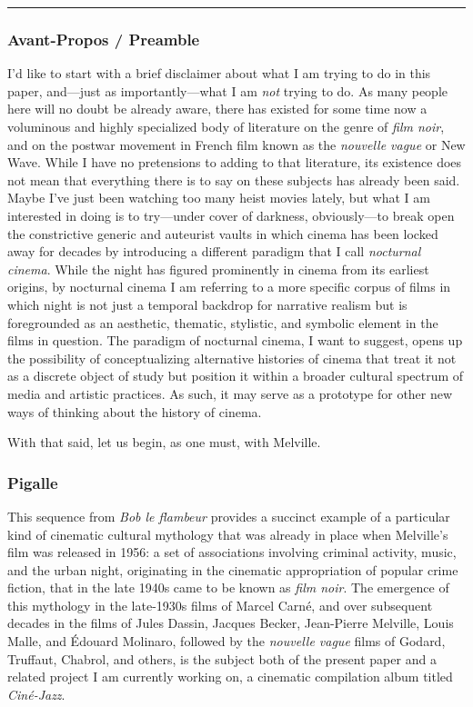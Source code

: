 \documentclass[
  letterpaper,
  DIV=11,
  numbers=noendperiod,
  oneside]{scrartcl}
\begin{document}
\begin{center}\rule{0.5\linewidth}{0.5pt}\end{center}

\subsubsection{Avant-Propos / Preamble}\label{avant-propos-preamble}

I'd like to start with a brief disclaimer about what I am trying to do
in this paper, and---just as importantly---what I am \emph{not} trying
to do. As many people here will no doubt be already aware, there has
existed for some time now a voluminous and highly specialized body of
literature on the genre of \emph{film noir}, and on the postwar movement
in French film known as the \emph{nouvelle vague} or New Wave. While I
have no pretensions to adding to that literature, its existence does not
mean that everything there is to say on these subjects has already been
said. Maybe I've just been watching too many heist movies lately, but
what I am interested in doing is to try---under cover of darkness,
obviously---to break open the constrictive generic and auteurist vaults
in which cinema has been locked away for decades by introducing a
different paradigm that I call \emph{nocturnal cinema}. While the night
has figured prominently in cinema from its earliest origins, by
nocturnal cinema I am referring to a more specific corpus of films in
which night is not just a temporal backdrop for narrative realism but is
foregrounded as an aesthetic, thematic, stylistic, and symbolic element
in the films in question. The paradigm of nocturnal cinema, I want to
suggest, opens up the possibility of conceptualizing alternative
histories of cinema that treat it not as a discrete object of study but
position it within a broader cultural spectrum of media and artistic
practices. As such, it may serve as a prototype for other new ways of
thinking about the history of cinema.

With that said, let us begin, as one must, with Melville.

\subsubsection{Pigalle}\label{pigalle}

This sequence from \emph{Bob le flambeur} provides a succinct example of
a particular kind of cinematic cultural mythology that was already in
place when Melville's film was released in 1956: a set of associations
involving criminal activity, music, and the urban night, originating in
the cinematic appropriation of popular crime fiction, that in the late
1940s came to be known as \emph{film noir}. The emergence of this
mythology in the late-1930s films of Marcel Carné, and over subsequent
decades in the films of Jules Dassin, Jacques Becker, Jean-Pierre
Melville, Louis Malle, and Édouard Molinaro, followed by the
\emph{nouvelle vague} films of Godard, Truffaut, Chabrol, and others, is
the subject both of the present paper and a related project I am
currently working on, a cinematic compilation album titled
\emph{Ciné-Jazz}.
\end{document}
